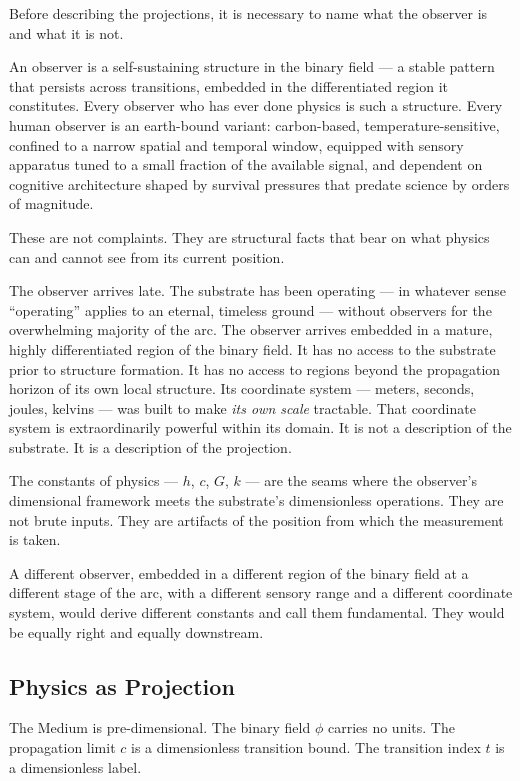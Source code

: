 \documentclass[11pt,letterpaper]{article}
\begin{document}
Before describing the projections, it is necessary to name what the observer is and what it is not.

An observer is a self-sustaining structure in the binary field --- a stable pattern that persists across transitions, embedded in the differentiated region it constitutes. Every observer who has ever done physics is such a structure. Every human observer is an earth-bound variant: carbon-based, temperature-sensitive, confined to a narrow spatial and temporal window, equipped with sensory apparatus tuned to a small fraction of the available signal, and dependent on cognitive architecture shaped by survival pressures that predate science by orders of magnitude.

These are not complaints. They are structural facts that bear on what physics can and cannot see from its current position.

The observer arrives late. The substrate has been operating --- in whatever sense ``operating'' applies to an eternal, timeless ground --- without observers for the overwhelming majority of the arc. The observer arrives embedded in a mature, highly differentiated region of the binary field. It has no access to the substrate prior to structure formation. It has no access to regions beyond the propagation horizon of its own local structure. Its coordinate system --- meters, seconds, joules, kelvins --- was built to make \emph{its own scale} tractable. That coordinate system is extraordinarily powerful within its domain. It is not a description of the substrate. It is a description of the projection.

The constants of physics --- \(h\), \(c\), \(G\), \(k\) --- are the seams where the observer's dimensional framework meets the substrate's dimensionless operations. They are not brute inputs. They are artifacts of the position from which the measurement is taken.

A different observer, embedded in a different region of the binary field at a different stage of the arc, with a different sensory range and a different coordinate system, would derive different constants and call them fundamental. They would be equally right and equally downstream.
\subsection{Physics as Projection}
\label{sec:orgcc0c53b}

The Medium is pre-dimensional. The binary field \(\phi\) carries no units. The propagation limit \(c\) is a dimensionless transition bound. The transition index \(t\) is a dimensionless label.
\end{document}
